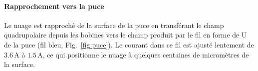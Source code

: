 
\paragraph{Rapprochement vers la puce}
Le nuage est rapproché de la surface de la puce en transférant le champ quadrupolaire depuis les bobines vers le champ produit par le fil en forme de U de la puce (fil bleu, Fig.~\ref{fig:puce}). Le courant dans ce fil est ajusté lentement de \( 3.6\,\mathrm{A} \) à \( 1.5\,\mathrm{A} \), ce qui positionne le nuage à quelques centaines de micromètres de la surface.




